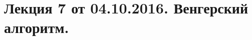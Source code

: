\documentclass[a4paper, 12pt]{article}
\begin{document}
\pagestyle{fancy}

\section{Лекция 7 от 04.10.2016. Венгерский алгоритм.}
\end{document}
